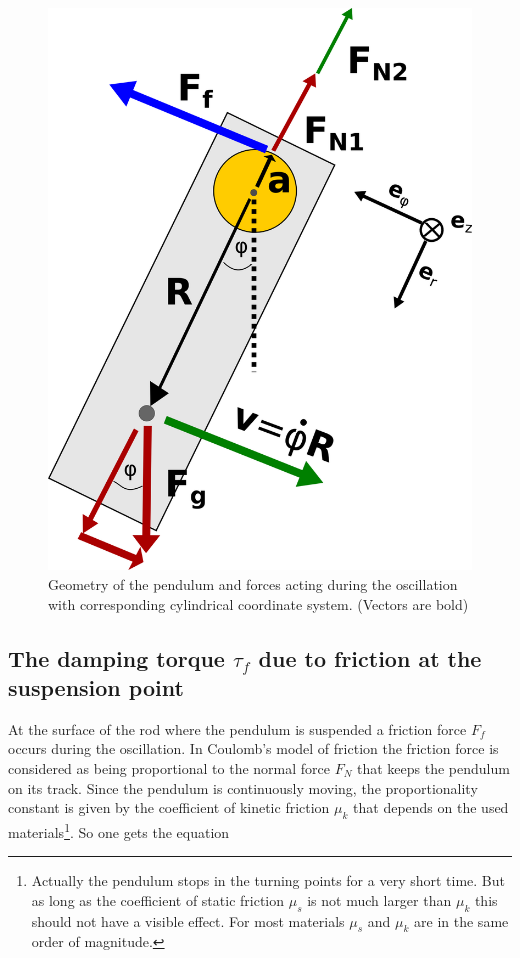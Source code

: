 \begin{figure}[h]
\begin{center}
\includegraphics[scale=0.55]{img/forces.png}
\end{center}\caption{Geometry of the pendulum and forces acting during the oscillation with corresponding cylindrical coordinate system. (Vectors are bold)}\label{fig:forces}
\end{figure}


\subsection{The damping torque $\tau_f$ due to friction at the suspension point}

At the surface of the rod where the pendulum is suspended a friction force $F_f$ occurs during the oscillation. In Coulomb's model of friction \cite{friction} the friction force is considered as being proportional to the normal force $F_N$ that keeps the pendulum on its track. Since the pendulum is continuously moving, the proportionality constant is given by the coefficient of kinetic friction $\mu_k$ that depends on the used materials\footnote{Actually the pendulum stops in the turning points for a very short time. But as long as the coefficient of static friction $\mu_s$ is not much larger than $\mu_k$ this should not have a visible effect. For most materials $\mu_s$ and $\mu_k$ are in the same order of magnitude.}. So one gets the equation

